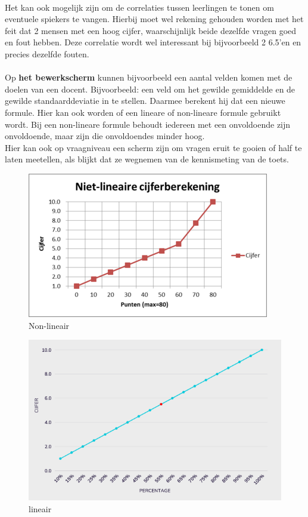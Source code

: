 \documentclass[12pt]{article}
\begin{document}
\begin{multicols}{2}
\\
Het kan ook mogelijk zijn om de correlaties tussen leerlingen te tonen om eventuele spiekers te vangen. Hierbij moet wel rekening gehouden worden met het feit dat 2 mensen met een hoog cijfer, waarschijnlijk beide dezelfde vragen goed en fout hebben. Deze correlatie  wordt wel interessant bij bijvoorbeeld 2 6.5'en en precies dezelfde fouten.\\
\\
Op \textbf{het bewerkscherm} kunnen bijvoorbeeld een aantal velden komen met de doelen van een docent. Bijvoorbeeld: een veld om het gewilde gemiddelde en de gewilde standaarddeviatie in te stellen. Daarmee berekent hij dat een nieuwe formule. Hier kan ook worden of een lineare of non-lineare formule gebruikt wordt. Bij een non-lineare formule behoudt iedereen met een onvoldoende zijn onvoldoende, maar zijn die onvoldoendes minder hoog. \\
Hier kan ook op vraagniveau een scherm zijn om vragen eruit te gooien of half te laten meetellen, als blijkt dat ze wegnemen van de kennismeting van de toets.
\begin{figure}[H]
    \centering
    \includegraphics[width=1\linewidth]{./images/methoden/analyseren/Niet-lineaire.png}
    \caption{Non-lineair}
    \label{fig:non-linear}
\end{figure}
\begin{figure}[H]
    \centering
    \includegraphics[width=1\linewidth]{./images/methoden/analyseren/linair.png}
    \caption{lineair}
    \label{fig:linair}
\end{figure}
\end{multicols}
\end{document}
